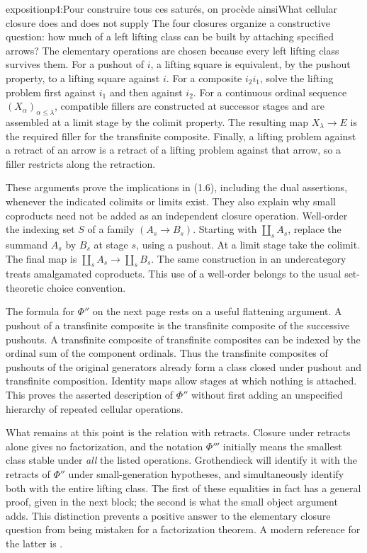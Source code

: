 \begin{dcomment}{exposition}{p4:Pour construire tous ces saturés, on procède ainsi}{What cellular closure does and does not supply}
The four closures organize a constructive question: how much of a left lifting class can be built by attaching specified arrows? The elementary operations are chosen because every left lifting class survives them. For a pushout of $i$, a lifting square is equivalent, by the pushout property, to a lifting square against $i$. For a composite $i_2i_1$, solve the lifting problem first against $i_1$ and then against $i_2$. For a continuous ordinal sequence $(X_\alpha)_{\alpha\leq\lambda}$, compatible fillers are constructed at successor stages and are assembled at a limit stage by the colimit property. The resulting map $X_\lambda\to E$ is the required filler for the transfinite composite. Finally, a lifting problem against a retract of an arrow is a retract of a lifting problem against that arrow, so a filler restricts along the retraction.

These arguments prove the implications in (1.6), including the dual assertions, whenever the indicated colimits or limits exist. They also explain why small coproducts need not be added as an independent closure operation. Well-order the indexing set $S$ of a family $(A_s\to B_s)$. Starting with $\coprod_sA_s$, replace the summand $A_s$ by $B_s$ at stage $s$, using a pushout. At a limit stage take the colimit. The final map is $\coprod_sA_s\to\coprod_sB_s$. The same construction in an undercategory treats amalgamated coproducts. This use of a well-order belongs to the usual set-theoretic choice convention.

The formula for $\Phi''$ on the next page rests on a useful flattening argument. A pushout of a transfinite composite is the transfinite composite of the successive pushouts. A transfinite composite of transfinite composites can be indexed by the ordinal sum of the component ordinals. Thus the transfinite composites of pushouts of the original generators already form a class closed under pushout and transfinite composition. Identity maps allow stages at which nothing is attached. This proves the asserted description of $\Phi''$ without first adding an unspecified hierarchy of repeated cellular operations.

What remains at this point is the relation with retracts. Closure under retracts alone gives no factorization, and the notation $\Phi'''$ initially means the smallest class stable under \emph{all} the listed operations. Grothendieck will identify it with the retracts of $\Phi''$ under small-generation hypotheses, and simultaneously identify both with the entire lifting class. The first of these equalities in fact has a general proof, given in the next block; the second is what the small object argument adds. This distinction prevents a positive answer to the elementary closure question from being mistaken for a factorization theorem. A modern reference for the latter is \citet[Theorem~2.1.14 and Corollary~2.1.15]{Hovey1999}.
\end{dcomment}

